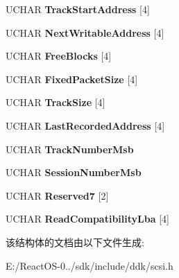 \begin{DoxyCompactItemize}
U\+C\+H\+AR {\bfseries Track\+Start\+Address} \mbox{[}4\mbox{]}
\item 
\mbox{\label{struct___t_r_a_c_k___i_n_f_o_r_m_a_t_i_o_n3_a68d752776505282ae69f5614853638de}} 
U\+C\+H\+AR {\bfseries Next\+Writable\+Address} \mbox{[}4\mbox{]}
\item 
\mbox{\label{struct___t_r_a_c_k___i_n_f_o_r_m_a_t_i_o_n3_a56d91f0fca78c4d8bb5dc8b0a26bc705}} 
U\+C\+H\+AR {\bfseries Free\+Blocks} \mbox{[}4\mbox{]}
\item 
\mbox{\label{struct___t_r_a_c_k___i_n_f_o_r_m_a_t_i_o_n3_a1c82be72bcfa60807354070efdde6eab}} 
U\+C\+H\+AR {\bfseries Fixed\+Packet\+Size} \mbox{[}4\mbox{]}
\item 
\mbox{\label{struct___t_r_a_c_k___i_n_f_o_r_m_a_t_i_o_n3_af86038d0e272077032c9ce6797c8387e}} 
U\+C\+H\+AR {\bfseries Track\+Size} \mbox{[}4\mbox{]}
\item 
\mbox{\label{struct___t_r_a_c_k___i_n_f_o_r_m_a_t_i_o_n3_aa714aa67916105460f82ea892121665a}} 
U\+C\+H\+AR {\bfseries Last\+Recorded\+Address} \mbox{[}4\mbox{]}
\item 
\mbox{\label{struct___t_r_a_c_k___i_n_f_o_r_m_a_t_i_o_n3_a5656b9a4eb43efcd53fcb6eae332ec6e}} 
U\+C\+H\+AR {\bfseries Track\+Number\+Msb}
\item 
\mbox{\label{struct___t_r_a_c_k___i_n_f_o_r_m_a_t_i_o_n3_a621cd24277d04a82314957f9d545e3fa}} 
U\+C\+H\+AR {\bfseries Session\+Number\+Msb}
\item 
\mbox{\label{struct___t_r_a_c_k___i_n_f_o_r_m_a_t_i_o_n3_a7ad08c06ccc5e5e680a55bf4f18877e3}} 
U\+C\+H\+AR {\bfseries Reserved7} \mbox{[}2\mbox{]}
\item 
\mbox{\label{struct___t_r_a_c_k___i_n_f_o_r_m_a_t_i_o_n3_a6d221ecbeb0efdd8560248f11dcecd07}} 
U\+C\+H\+AR {\bfseries Read\+Compatibility\+Lba} \mbox{[}4\mbox{]}
\end{DoxyCompactItemize}


该结构体的文档由以下文件生成\+:\begin{DoxyCompactItemize}
\item 
E\+:/\+React\+O\+S-\/0../sdk/include/ddk/scsi.\+h\end{DoxyCompactItemize}
